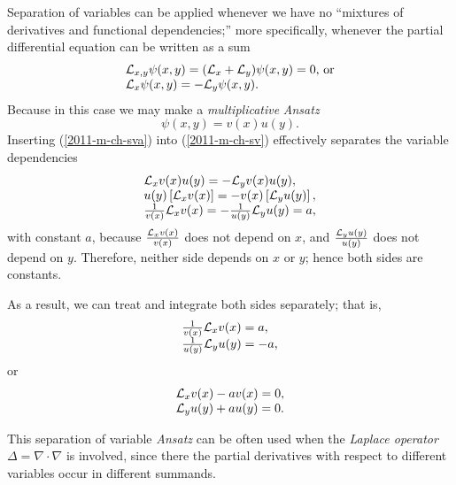 Separation of variables can be applied whenever we have no ``mixtures of derivatives and functional dependencies;''
more specifically,
whenever the  partial differential equation can be written as a sum
\begin{equation}
\begin{array}  {l}
{\cal L}_{x,y} \psi(x,y) = ({\cal L}_{x} + {\cal L}_y)\psi (x,y) =  0\textrm{, or}  \\
{\cal L}_{x} \psi (x,y) =  - {\cal L}_y \psi (x,y).
\end{array}
\label{2011-m-ch-sveq}
\end{equation}
Because in this case we may make a {\em multiplicative} {\it Ansatz}
\begin{equation}
\psi (x,y)= v(x)u(y) .
\label{2011-m-ch-sva}
\end{equation}
Inserting (\ref{2011-m-ch-sva}) into (\ref{2011-m-ch-sv}) effectively  separates the variable dependencies
\begin{equation}
\begin{array}  {l}
{\cal L}_{x} v(x)u(y) =   - {\cal L}_y v(x)u(y), \\
u(y)\left[ {\cal L}_{x} v(x)\right]
 =   -  v(x)\left[{\cal L}_y u(y)\right]
, \\
\frac{1}{v(x)}{\cal L}_{x} v(x) =   - \frac{1}{u(y)}{\cal L}_y u(y)=a,
\end{array}
\label{2011-m-ch-sv1}
\end{equation}
with constant $a$, because
$\frac{{\cal L}_{x} v(x)}{v(x)}$  does not depend on $x$,
and  $\frac{{\cal L}_y u(y)}{u(y)}$  does not depend on $y$.
Therefore,
neither side depends on $x$ or $y$; hence both sides are constants.

As a result, we can treat and integrate both sides separately; that is,
\begin{equation}
\begin{array}  {l}
\frac{1}{v(x)} {\cal L}_{x} v(x)= a,\\
\frac{1}{u(y)}{\cal L}_y u(y)=-a
,
\end{array}
\label{2011-m-ch-sv2}
\end{equation}
or
\begin{equation}
\begin{array}  {l}
{\cal L}_{x} v(x)- av(x)=0,\\
{\cal L}_y u(y)+a u(y) = 0
.
\end{array}
\label{2011-m-ch-sv2or}
\end{equation}

This separation of variable {\it Ansatz}
can be often used when the
{\em Laplace operator}
$\Delta=\nabla  \cdot \nabla$
is involved, since there the partial derivatives with respect to different variables
occur in different summands.

